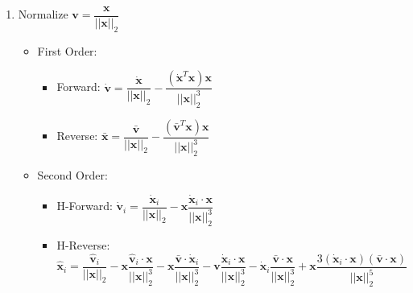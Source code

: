 \documentclass{article}
\newcommand{\vx}{\mathbf{x}}
\newcommand{\vxpi}{\dot{\mathbf{x}}_{i}}
\newcommand{\vxhi}{\hat{\mathbf{x}}_{i}}
\newcommand{\vv}{\mathbf{v}}
\newcommand{\vvb}{\bar{\mathbf{v}}}
\newcommand{\vvpi}{\dot{\mathbf{v}}_{i}}
\newcommand{\vvhi}{\hat{\mathbf{v}}_{i}}
\begin{document}
\begin{enumerate}
        \item Normalize $\mathbf{v} = \dfrac{\mathbf{x}}{||\mathbf{x}||_{2}}$
        \begin{itemize}
            \item First Order:
            \begin{itemize}
                \item Forward: $\dot{\mathbf{v}} = \dfrac{\dot{\mathbf{x}}}{||\mathbf{x}||_{2}} - \dfrac{(\dot{\mathbf{x}}^{T} \mathbf{x}) \mathbf{x}}{||\mathbf{x}||_{2}^{3}}$
                \item Reverse: $\bar{\mathbf{x}} = \dfrac{\bar{\mathbf{v}}}{||\mathbf{x}||_{2}} - \dfrac{(\bar{\mathbf{v}}^{T} \mathbf{x}) \mathbf{x}}{||\mathbf{x}||_{2}^{3}}$
            \end{itemize}
            \item Second Order:
            \begin{itemize}
                \item H-Forward: $\vvpi = \dfrac{\vxpi}{|| \vx ||_{2}} - \vx \dfrac{\vxpi \cdot \vx}{|| \vx ||_{2}^{3}}$
                \item H-Reverse: $\vxhi = \dfrac{\vvhi}{|| \vx ||_{2}} - \vx \dfrac{\vvhi \cdot \vx}{|| \vx ||_{2}^{3}} - \vx \dfrac{\vvb \cdot \vxpi}{|| \vx ||_{2}^{3}} - \vv \dfrac{\vxpi \cdot \vx}{|| \vx ||_{2}^{3}} - \vxpi \dfrac{\vvb \cdot \vx}{|| \vx ||_{2}^{3}} + \vx \dfrac{3 (\vxpi \cdot \vx) (\vvb \cdot \vx)}{|| \vx ||_{2}^{5}}$
            \end{itemize}
        \end{itemize}


\end{enumerate}
\end{document}
